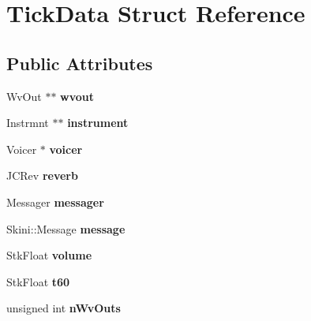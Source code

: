 \hypertarget{structTickData}{}\section{Tick\+Data Struct Reference}
\label{structTickData}
\subsection*{Public Attributes}
\begin{DoxyCompactItemize}
\item 
Wv\+Out $\ast$$\ast$ {\bfseries wvout}\hypertarget{structTickData_a99559444aee6dbc126f650744c5487ec}{}\label{structTickData_a99559444aee6dbc126f650744c5487ec}

\item 
Instrmnt $\ast$$\ast$ {\bfseries instrument}\hypertarget{structTickData_aa2b6f7f6ad9c886711e9393aca979677}{}\label{structTickData_aa2b6f7f6ad9c886711e9393aca979677}

\item 
Voicer $\ast$ {\bfseries voicer}\hypertarget{structTickData_ade98160894388bc8534d2003a7a63ffe}{}\label{structTickData_ade98160894388bc8534d2003a7a63ffe}

\item 
J\+C\+Rev {\bfseries reverb}\hypertarget{structTickData_a3d1563b3668509206700be3e02138827}{}\label{structTickData_a3d1563b3668509206700be3e02138827}

\item 
Messager {\bfseries messager}\hypertarget{structTickData_a3d0c2a9deef2fd2bd94b3ba8c6b176eb}{}\label{structTickData_a3d0c2a9deef2fd2bd94b3ba8c6b176eb}

\item 
Skini\+::\+Message {\bfseries message}\hypertarget{structTickData_a3061482937dae6c292d4d51400a6143a}{}\label{structTickData_a3061482937dae6c292d4d51400a6143a}

\item 
Stk\+Float {\bfseries volume}\hypertarget{structTickData_a6d0680a0bcc9d2c35104ad9721777223}{}\label{structTickData_a6d0680a0bcc9d2c35104ad9721777223}

\item 
Stk\+Float {\bfseries t60}\hypertarget{structTickData_adf8ffe69c6880e995aec842a032ee9fe}{}\label{structTickData_adf8ffe69c6880e995aec842a032ee9fe}

\item 
unsigned int {\bfseries n\+Wv\+Outs}\hypertarget{structTickData_abda86f5671f18f3e09fa6e0877c70bca}{}\label{structTickData_abda86f5671f18f3e09fa6e0877c70bca}


\end{DoxyCompactItemize}
